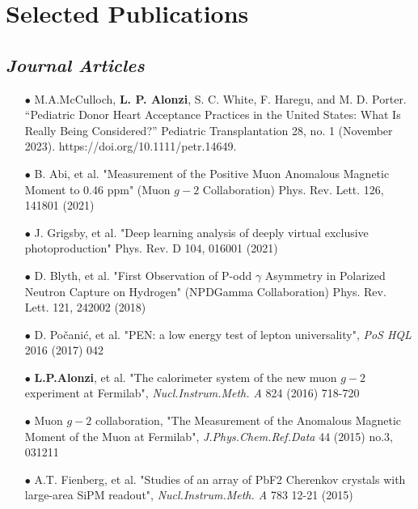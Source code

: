 \documentclass{article}[10pt]
\begin{document}
\section*{Selected Publications}
\subsection*{\emph{Journal Articles}}
\begin{itemize}
\item [$\bullet$] M.A.McCulloch, {\bf L. P. Alonzi}, S. C. White, F. Haregu, and M. D. Porter. “Pediatric Donor Heart Acceptance Practices in the United States: What Is Really Being Considered?” Pediatric Transplantation 28, no. 1 (November 2023). https://doi.org/10.1111/petr.14649.
\item [$\bullet$] B. Abi, et al. "Measurement of the Positive Muon Anomalous Magnetic Moment to 0.46 ppm" (Muon $g-2$ Collaboration) Phys. Rev. Lett. 126, 141801 (2021)
\item [$\bullet$] J. Grigsby, et al. "Deep learning analysis of deeply virtual exclusive photoproduction" Phys. Rev. D 104, 016001 (2021)
\item [$\bullet$] D. Blyth, et al. "First Observation of P-odd $\gamma$ Asymmetry in Polarized Neutron Capture on Hydrogen" (NPDGamma Collaboration) Phys. Rev. Lett. 121, 242002 (2018)
\item [$\bullet$] D. Po\v{c}ani\'c, et al. "PEN: a low energy test of lepton universality", \emph{PoS HQL} 2016 (2017) 042
\item [$\bullet$] {\bf L.P.Alonzi}, et al. "The calorimeter system of the new muon $g-2$ experiment at Fermilab", \emph{Nucl.Instrum.Meth. A} 824 (2016) 718-720
\item [$\bullet$] Muon $g-2$ collaboration, "The Measurement of the Anomalous Magnetic Moment of the Muon at Fermilab", \emph{J.Phys.Chem.Ref.Data} 44 (2015) no.3, 031211
\item [$\bullet$] A.T. Fienberg, et al. "Studies of an array of PbF2 Cherenkov crystals with large-area SiPM readout", \emph{Nucl.Instrum.Meth. A} 783 12-21 (2015)
\end{itemize}
\end{document}
